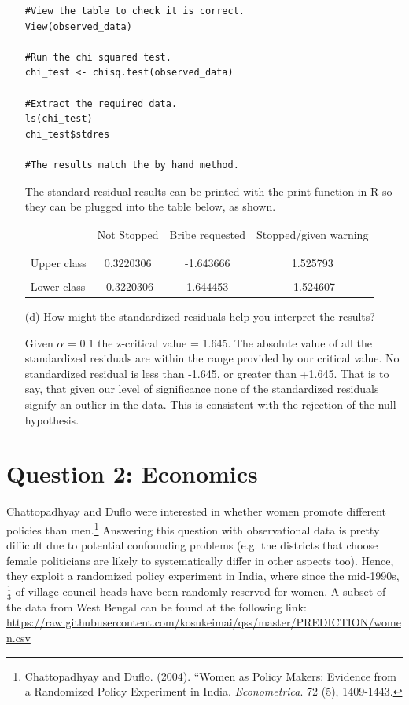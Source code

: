 \documentclass[12pt,letterpaper]{article}
\begin{document}
\begin{enumerate}
\begin{Verbatim}
#View the table to check it is correct.
View(observed_data)
	
#Run the chi squared test.
chi_test <- chisq.test(observed_data)
	
#Extract the required data.
ls(chi_test)
chi_test$stdres
	
#The results match the by hand method.
\end{Verbatim}
	The standard residual results can be printed with the print function in R so they can be plugged into the table below, as shown.
	\begin{table}[h]
		\centering
		\begin{tabular}{l | c c c }
			& Not Stopped & Bribe requested & Stopped/given warning \\
			\\[-1.8ex] 
			\hline \\[-1.8ex]
			Upper class & 0.3220306  & -1.643666 & 1.525793  \\
			\\
			Lower class & -0.3220306 & 1.644453  &  -1.524607 \\
			
		\end{tabular}
	\end{table}
	
	
	\vspace{7cm}
	\item [(d)] How might the standardized residuals help you interpret the results?  
	
	Given $\alpha$ = 0.1 the z-critical value = 1.645. The absolute value of all the standardized residuals are within the range provided by our critical value. No standardized residual is less than -1.645, or greater than +1.645. That is to say, that given our level of significance none of the standardized residuals signify an outlier in the data. This is consistent with the rejection of the null hypothesis.
	
\end{enumerate}
\newpage

\section*{Question 2: Economics}
Chattopadhyay and Duflo were interested in whether women promote different policies than men.\footnote{Chattopadhyay and Duflo. (2004). ``Women as Policy Makers: Evidence from a Randomized Policy Experiment in India. \textit{Econometrica}. 72 (5), 1409-1443.} Answering this question with observational data is pretty difficult due to potential confounding problems (e.g. the districts that choose female politicians are likely to systematically differ in other aspects too). Hence, they exploit a randomized policy experiment in India, where since the mid-1990s, $\frac{1}{3}$ of village council heads have been randomly reserved for women. A subset of the data from West Bengal can be found at the following link: \url{https://raw.githubusercontent.com/kosukeimai/qss/master/PREDICTION/women.csv}\\
\end{document}
